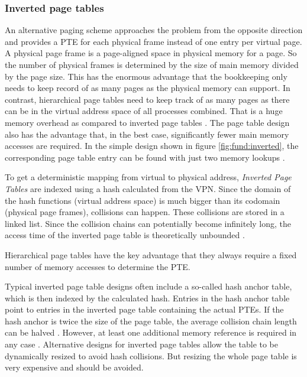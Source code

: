 \subsubsection{Inverted page tables}
An alternative paging scheme approaches the problem from the opposite direction and provides a PTE
for each physical frame instead of one entry per virtual page.
A physical page frame is a page-aligned space in physical memory for a page.
So the number of physical frames is determined by the size of main memory divided by the page size.
This has the enormous advantage that the bookkeeping only needs to keep record of as many pages
as the physical memory can support.
In contrast, hierarchical page tables need to keep track of as many pages as there can be in the virtual
address space of all processes combined. That is a huge memory overhead as compared to inverted page tables
\cite{jacob1998look}.
The page table design also has the advantage that, in the best case, significantly fewer main memory
accesses are required. In the simple design shown in figure \ref{fig:fund:inverted}, the corresponding
page table entry can be found with just two memory lookups \cite{skarlatos2020elastic}.

To get a deterministic mapping from virtual to physical address, \emph{Inverted Page Tables} are indexed
using a hash calculated from the VPN.
Since the domain of the hash functions (virtual address space) is much bigger than its codomain (physical page frames),
collisions can happen. These collisions are stored in a linked list. Since
the collision chains can potentially become infinitely long, the access time of the inverted page table is theoretically
unbounded \cite{tanenbaumOS}.

Hierarchical page tables have the key advantage that they always require
a fixed number of memory accesses to determine the PTE.

Typical inverted page table designs often include a so-called hash anchor table, which is then
indexed by the calculated hash. Entries in the hash anchor table point to entries in the inverted page table
containing the actual PTEs. If the hash anchor is twice the size
of the page table, the average collision chain length can be halved \cite{jacob1998virtualissues}.
However, at least one additional memory reference is required in any case \cite{jacob1998virtualissues}.
Alternative designs for inverted page tables allow the table to be dynamically resized to avoid hash collisions.
But resizing the whole page table is very expensive and should be avoided\cite{skarlatos2020elastic}.

